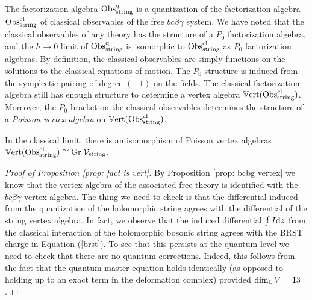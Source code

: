 The factorization algebra ${\rm Obs}^{\rm q}_{\rm string}$ is a quantization of the factorization algebra ${\rm Obs}^{{\rm cl}}_{\rm string}$ of classical observables of the free $bc\beta\gamma$ system.
We have noted that the classical observables of any theory has the structure of a $P_0$ factorization algebra, and the $\hbar \to 0$ limit of ${\rm Obs}^{\rm q}_{\rm string}$ is isomorphic to ${\rm Obs}^{{\rm cl}}_{\rm string}$ as $P_0$ factorization algebras.
By definition, the classical observables are simply functions on the solutions to the classical equations of motion.
The $P_0$ structure is induced from the symplectic pairing of degree $(-1)$ on the fields. 
The classical factorization algebra still has enough structure to determine a vertex algebra $\mathbb{V}{\rm ert}({\rm Obs}^{\rm cl}_{\rm string})$.
Moreover, the $P_0$ bracket on the classical observables determines the structure of a {\em Poisson vertex algebra} on $\mathbb{V}{\rm ert}({\rm Obs}^{{\rm cl}}_{\rm string})$. 

\begin{cor} In the classical limit, there is an isomorphism of Poisson vertex algebras~$\mathbb{V}{\rm ert}({\rm Obs}^{{\rm cl}}_{\rm string}) \cong {\rm Gr} \; \mathcal{V}_{\rm string}$.
\end{cor}

\begin{proof}[Proof of Proposition \ref{prop: fact is vert}] By Proposition \ref{prop: bcbg vertex} we know that the vertex algebra of the associated free theory is identified with the $bc\beta\gamma$ vertex algebra. 
The thing we need to check is that the differential induced from the quantization of the holomorphic string agrees with the differential of the string vertex algebra. 
In fact, we observe that the induced differential $\oint I {\rm d} z$ from the classical interaction of the holomorphic bosonic string agrees with the BRST charge in Equation (\ref{brst}). 
To see that this persists at the quantum level we need to check that there are no quantum corrections. 
Indeed, this follows from the fact that the quantum master equation holds identically (as opposed to holding up to an exact term in the deformation complex) provided $\dim_\mathbb C V = 13$. 
\end{proof}




